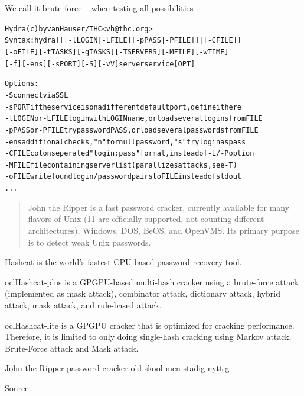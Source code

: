 \documentclass[Screen16to9,17pt]{foils}
\begin{document}
\begin{list1}
\item We call it brute force -- when testing all possibilities
\end{list1}

\begin{alltt}\small
Hydra (c) by van Hauser / THC <vh@thc.org>
Syntax: hydra [[[-l LOGIN|-L FILE] [-p PASS|-P FILE]] | [-C FILE]]
[-o FILE] [-t TASKS] [-g TASKS] [-T SERVERS] [-M FILE] [-w TIME]
[-f] [-e ns] [-s PORT] [-S] [-vV] server service [OPT]

Options:
  -S        connect via SSL
  -s PORT   if the service is on a different default port, define it here
  -l LOGIN  or -L FILE login with LOGIN name, or load several logins from FILE
  -p PASS   or -P FILE try password PASS, or load several passwords from FILE
  -e ns     additional checks, "n" for null password, "s" try login as pass
  -C FILE   colon seperated "login:pass" format, instead of -L/-P option
  -M FILE   file containing server list (parallizes attacks, see -T)
  -o FILE   write found login/password pairs to FILE instead of stdout
...
\end{alltt}



\begin{quote}
John the Ripper is a fast password cracker, currently available for
many flavors of Unix (11 are officially supported, not counting
different architectures), Windows, DOS, BeOS, and OpenVMS. Its primary
purpose is to detect weak Unix passwords.
\end{quote}

\begin{list2}
\item Hashcat is the world's fastest CPU-based password recovery tool.
\item oclHashcat-plus is a GPGPU-based multi-hash cracker using a brute-force attack (implemented as mask attack), combinator attack, dictionary attack, hybrid attack, mask attack, and rule-based attack.
\item oclHashcat-lite is a GPGPU cracker that is optimized for cracking performance. Therefore, it is limited to only doing single-hash cracking using Markov attack, Brute-Force attack and Mask attack.
\item John the Ripper password cracker old skool men stadig nyttig
\end{list2}

Source:\\
\\
\end{document}
